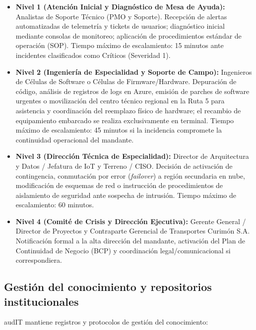 \begin{itemize}
  \item \textbf{Nivel 1 (Atención Inicial y Diagnóstico de Mesa de Ayuda):} Analistas de Soporte Técnico (PMO y Soporte). Recepción de alertas automatizadas de telemetría y tickets de usuarios; diagnóstico inicial mediante consolas de monitoreo; aplicación de procedimientos estándar de operación (SOP). Tiempo máximo de escalamiento: 15 minutos ante incidentes clasificados como Críticos (Severidad 1).
  \item \textbf{Nivel 2 (Ingeniería de Especialidad y Soporte de Campo):} Ingenieros de Células de Software o Células de Firmware/Hardware. Depuración de código, análisis de registros de logs en Azure, emisión de parches de software urgentes o movilización del centro técnico regional en la Ruta 5 para asistencia y coordinación del reemplazo físico de hardware; el recambio de equipamiento embarcado se realiza exclusivamente en terminal. Tiempo máximo de escalamiento: 45 minutos si la incidencia compromete la continuidad operacional del mandante.
  \item \textbf{Nivel 3 (Dirección Técnica de Especialidad):} Director de Arquitectura y Datos / Jefatura de IoT y Terreno / CISO. Decisión de activación de contingencia, conmutación por error (\textit{failover}) a región secundaria en nube, modificación de esquemas de red o instrucción de procedimientos de aislamiento de seguridad ante sospecha de intrusión. Tiempo máximo de escalamiento: 60 minutos.
  \item \textbf{Nivel 4 (Comité de Crisis y Dirección Ejecutiva):} Gerente General / Director de Proyectos y Contraparte Gerencial de Transportes Curimón S.A. Notificación formal a la alta dirección del mandante, activación del Plan de Continuidad de Negocio (BCP) y coordinación legal/comunicacional si correspondiera.
\end{itemize}

\subsection{Gestión del conocimiento y repositorios institucionales}\label{sec:1-conocimiento}

audIT mantiene registros y protocolos de gestión del conocimiento:

